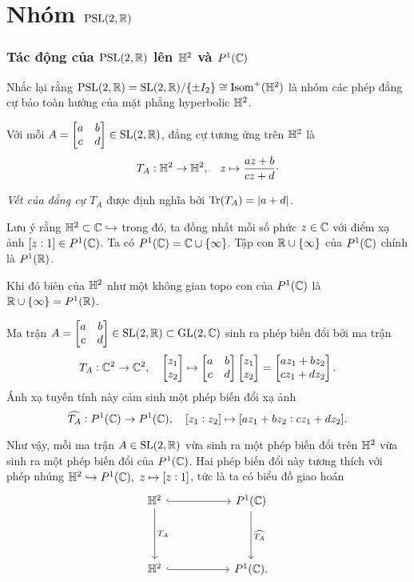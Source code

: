 \section{Nhóm $\operatorname{PSL}(2,\mathbb{R})$}
\subsubsection{Tác động của $\operatorname{PSL}(2,\mathbb{R})$ lên $\mathbb{H}^2$ và $P^1(\mathbb{C})$}
Nhắc lại rằng  $\operatorname{PSL}(2,\mathbb{R}) = \operatorname{SL}(2,\mathbb{R})/\{\pm I_2\} \cong \operatorname{Isom}^+(\mathbb{H}^2)$ là nhóm các phép đẳng cự bảo toàn hướng của mặt phẳng hyperbolic $\mathbb{H}^2$.

Với mỗi $A = \begin{bmatrix} a & b \\ c & d \\ \end{bmatrix} \in \operatorname{SL}(2,\mathbb{R})$, đẳng cự tương ứng trên $\mathbb{H}^2$ là 
\[T_A: \mathbb{H}^2 \to \mathbb{H}^2,\quad z\mapsto \dfrac{az+b}{cz+d}\cdot\]

\textit{Vết của đẳng cự $T_A$} được định nghĩa bởi $\operatorname{Tr}(T_A) = |a+d|$.

Lưu ý rằng $\mathbb{H}^2 \subset \mathbb{C} \hookrightarrow$ trong đó, ta đồng nhất mỗi số phức $z\in \mathbb{C}$ với điểm xạ ảnh $[z:1] \in P^1(\mathbb{C})$. Ta có $P^1(\mathbb{C}) = \mathbb{C} \cup \{\infty\}$. Tập con $\mathbb{R} \cup \{\infty\}$ của $P^1(\mathbb{C})$ chính là $P^1(\mathbb{R})$.

Khi đó biên của $\mathbb{H}^2$ như một không gian topo con của $P^1(\mathbb{C})$ là $\mathbb{R} \cup \{\infty\} = P^1(\mathbb{R})$.

Ma trận $A = \begin{bmatrix} a & b \\ c & d \\ \end{bmatrix} \in \operatorname{SL}(2,\mathbb{R}) \subset \operatorname{GL}(2,\mathbb{C})$ sinh ra phép biến đổi bởi ma trận
\[T_A: \mathbb{C}^2 \to \mathbb{C}^2,\quad
      \begin{bmatrix}
        z_1 \\ z_2    
      \end{bmatrix} \mapsto \begin{bmatrix} a & b \\ c & d \\ \end{bmatrix} \begin{bmatrix}
          z_1 \\ z_2
      \end{bmatrix} = \begin{bmatrix}
        az_1 + bz_2 \\ cz_1+dz_2    
      \end{bmatrix}.\]
Ánh xạ tuyến tính này cảm sinh một phép biến đổi xạ ảnh
\[\widehat{T_A}: P^1(\mathbb{C}) \to P^1(\mathbb{C}), \quad [z_1:z_2] \mapsto [az_1+bz_2:cz_1+dz_2].\]

Như vậy, mỗi ma trận $A \in \operatorname{SL}(2,\mathbb{R})$ vừa sinh ra một phép biến đổi trên $\mathbb{H}^2$ vừa sinh ra một phép biến đổi của $P^1(\mathbb{C})$. Hai phép biến đổi này tương thích với phép nhúng $\mathbb{H}^2 \hookrightarrow P^1(\mathbb{C}),~z\mapsto [z:1]$, tức là ta có biểu đồ giao hoán 
\[\begin{tikzcd}
	\hh && {P^1(\C)} \\
	& {} \\
	\hh && {P^1(\C).}
	\arrow["", hook, from=1-1, to=1-3]
	\arrow["{T_A}", from=1-1, to=3-1]
	\arrow["{\widehat{T_A}}", from=1-3, to=3-3]
	\arrow["", hook, from=3-1, to=3-3]
\end{tikzcd}\]

